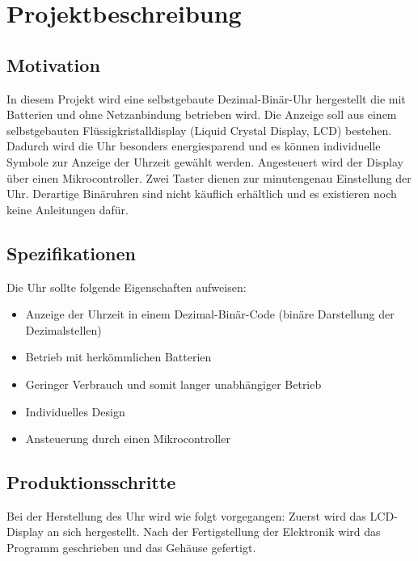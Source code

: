 \section{Projektbeschreibung}
\subsection{Motivation}
In diesem Projekt wird eine selbstgebaute Dezimal-Binär-Uhr hergestellt die mit Batterien und ohne Netzanbindung betrieben wird. Die Anzeige soll aus einem selbstgebauten Flüssigkristalldisplay (Liquid Crystal Display, LCD) bestehen. Dadurch wird die Uhr besonders energiesparend und es können individuelle Symbole zur Anzeige der Uhrzeit gewählt werden. Angesteuert wird der Display über einen Mikrocontroller. Zwei Taster dienen zur minutengenau Einstellung der Uhr. Derartige Binäruhren sind nicht käuflich erhältlich und es existieren noch keine Anleitungen dafür.

\subsection{Spezifikationen}
Die Uhr sollte folgende Eigenschaften aufweisen:
\begin{itemize}
\item Anzeige der Uhrzeit in einem Dezimal-Binär-Code (binäre Darstellung der Dezimalstellen)
\item Betrieb mit herkömmlichen Batterien
\item Geringer Verbrauch und somit langer unabhängiger Betrieb
\item Individuelles Design
\item Ansteuerung durch einen Mikrocontroller
\end{itemize}

\subsection{Produktionsschritte}

Bei der Herstellung des Uhr wird wie folgt vorgegangen: Zuerst wird das LCD-Display an sich hergestellt. Nach der Fertigstellung der Elektronik wird das Programm geschrieben und das Gehäuse gefertigt. 



